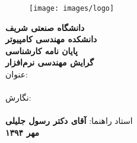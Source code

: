 \thispagestyle{empty}
\begin{center}
\vspace{-2cm}
\begin{figure}
\centerline{\texttt{[image: images/logo]}}
\end{figure}
\makeatletter
{\bf دانشگاه صنعتی شریف  }\\ 
{\bf دانشکده مهندسی کامپیوتر }\vspace{0.3cm}\\
{\bf پایان نامه کارشناسی  }\\ 
{ \bf گرایش مهندسی نرم‌افزار }\\
\vspace{0.4cm}
 عنوان:\\
\vspace{0.3cm}
{\Huge\bf  \@title}\vspace{1cm}\\

نگارش:\vspace{0.2cm}\\

{\Large \bf \@author}\\
\vspace{0.5cm}
 استاد راهنما: {\Large \bf  آقای دکتر رسول جلیلی }\\
\vspace{0.3cm}
{\large \bf  مهر ۱۳۹۴   }\\
\end{center}
\makeatother
\clearpage